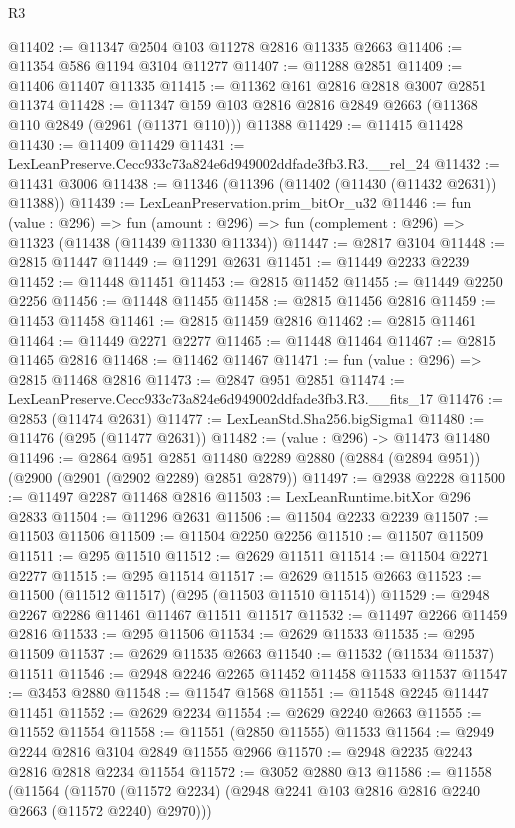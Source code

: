 \begin{lexlean}{R3}
\begin{coremodule}
@11402 := @11347 @2504 @103 @11278 @2816 @11335 @2663
@11406 := @11354 @586 @1194 @3104 @11277
@11407 := @11288 @2851
@11409 := @11406 @11407 @11335
@11415 := @11362 @161 @2816 @2818 @3007 @2851 @11374
@11428 := @11347 @159 @103 @2816 @2816 @2849 @2663 (@11368 @110 @2849 (@2961 (@11371 @110))) @11388
@11429 := @11415 @11428
@11430 := @11409 @11429
@11431 := LexLeanPreserve.Cecc933c73a824e6d949002ddfade3fb3.R3.__rel_24
@11432 := @11431 @3006
@11438 := @11346 (@11396 (@11402 (@11430 (@11432 @2631)) @11388))
@11439 := LexLeanPreservation.prim_bitOr_u32
@11446 := fun (value : @296) =>
  fun (amount : @296) => fun (complement : @296) => @11323 (@11438 (@11439 @11330 @11334))
@11447 := @2817 @3104
@11448 := @2815 @11447
@11449 := @11291 @2631
@11451 := @11449 @2233 @2239
@11452 := @11448 @11451
@11453 := @2815 @11452
@11455 := @11449 @2250 @2256
@11456 := @11448 @11455
@11458 := @2815 @11456 @2816
@11459 := @11453 @11458
@11461 := @2815 @11459 @2816
@11462 := @2815 @11461
@11464 := @11449 @2271 @2277
@11465 := @11448 @11464
@11467 := @2815 @11465 @2816
@11468 := @11462 @11467
@11471 := fun (value : @296) => @2815 @11468 @2816
@11473 := @2847 @951 @2851
@11474 := LexLeanPreserve.Cecc933c73a824e6d949002ddfade3fb3.R3.__fits_17
@11476 := @2853 (@11474 @2631)
@11477 := LexLeanStd.Sha256.bigSigma1
@11480 := @11476 (@295 (@11477 @2631))
@11482 := (value : @296) -> @11473 @11480
@11496 := @2864
    @951
    @2851
    @11480
    @2289
    @2880
    (@2884 (@2894 @951))
    (@2900 (@2901 (@2902 @2289) @2851 @2879))
@11497 := @2938 @2228
@11500 := @11497 @2287 @11468 @2816
@11503 := LexLeanRuntime.bitXor @296 @2833
@11504 := @11296 @2631
@11506 := @11504 @2233 @2239
@11507 := @11503 @11506
@11509 := @11504 @2250 @2256
@11510 := @11507 @11509
@11511 := @295 @11510
@11512 := @2629 @11511
@11514 := @11504 @2271 @2277
@11515 := @295 @11514
@11517 := @2629 @11515 @2663
@11523 := @11500 (@11512 @11517) (@295 (@11503 @11510 @11514))
@11529 := @2948 @2267 @2286 @11461 @11467 @11511 @11517
@11532 := @11497 @2266 @11459 @2816
@11533 := @295 @11506
@11534 := @2629 @11533
@11535 := @295 @11509
@11537 := @2629 @11535 @2663
@11540 := @11532 (@11534 @11537) @11511
@11546 := @2948 @2246 @2265 @11452 @11458 @11533 @11537
@11547 := @3453 @2880
@11548 := @11547 @1568
@11551 := @11548 @2245 @11447 @11451
@11552 := @2629 @2234
@11554 := @2629 @2240 @2663
@11555 := @11552 @11554
@11558 := @11551 (@2850 @11555) @11533
@11564 := @2949 @2244 @2816 @3104 @2849 @11555 @2966
@11570 := @2948 @2235 @2243 @2816 @2818 @2234 @11554
@11572 := @3052 @2880 @13
@11586 := @11558
    (@11564 (@11570 (@11572 @2234) (@2948 @2241 @103 @2816 @2816 @2240 @2663 (@11572 @2240) @2970)))

\end{coremodule}
\end{lexlean}
